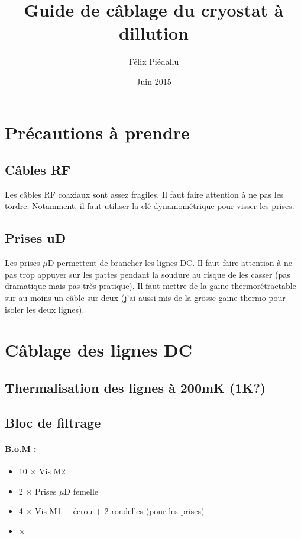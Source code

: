 \documentclass[a4paper,11pt]{article}
\title{Guide de câblage du cryostat à dillution}
\author{Félix Piédallu}
\date{Juin 2015}
\newcommand{\fois}{$\times$ }
\newcommand{\uD}{$\mu$D }
\newenvironment{BOM}
  {%
    \paragraph{B.o.M : } \begin{itemize}%
  }{%
    \end{itemize}\medskip%
  }
\begin{document}
\maketitle
\tableofcontents

\begin{abstract}
\end{abstract}

\section{Précautions à prendre}
\subsection{Câbles RF}
Les câbles RF coaxiaux sont assez fragiles. Il faut faire attention à ne pas les tordre. Notamment, il faut utiliser la clé dynamométrique pour visser les prises.

\subsection{Prises uD}
Les prises \uD permettent de brancher les lignes DC. Il faut faire attention à ne pas trop appuyer sur les pattes pendant la soudure au risque de les casser (pas dramatique mais pas très pratique). Il faut mettre de la gaine thermorétractable sur au moins un câble sur deux (j'ai aussi mis de la grosse gaine thermo pour isoler les deux lignes).

\section{Câblage des lignes DC}
\subsection{Thermalisation des lignes à 200mK (1K?)}
\subsubsection{}

\subsection{Bloc de filtrage}
\label{subsec:DC/blocDeFiltrage}
\begin{BOM}
    \item 10 \fois Vis M2
    \item 2 \fois Prises \uD femelle
    \item 4 \fois Vis M1 + écrou + 2 rondelles (pour les prises)
    \item \fois 
\end{BOM}
\end{document}
